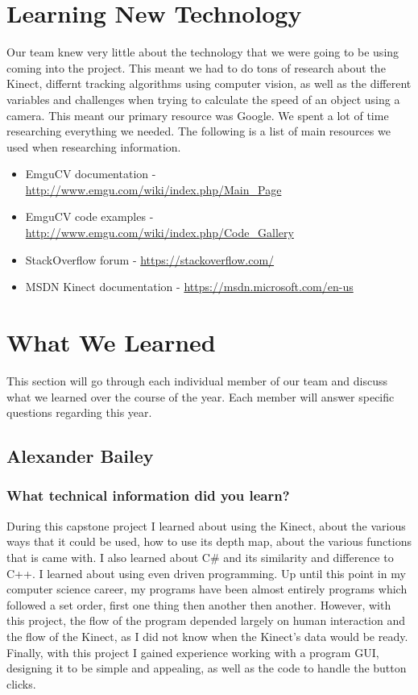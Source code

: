 \documentclass[onecolumn, draftclsnofoot,10pt, compsoc]{IEEEtran}
\begin{document}
\section{Learning New Technology}
Our team knew very little about the technology that we were going to be using coming into the project. This meant we had to do tons of research about the Kinect, differnt tracking algorithms using computer vision, as well as the different variables and challenges when trying to calculate the speed of an object using a camera.
This meant our primary resource was Google.
We spent a lot of time researching everything we needed.
The following is a list of main resources we used when researching information.
\begin{itemize}
\item EmguCV documentation - \url{http://www.emgu.com/wiki/index.php/Main_Page}
\item EmguCV code examples - \url{http://www.emgu.com/wiki/index.php/Code_Gallery}
\item StackOverflow forum - \url{https://stackoverflow.com/}
\item MSDN Kinect documentation - \url{https://msdn.microsoft.com/en-us}
\end{itemize}

\section{What We Learned}
This section will go through each individual member of our team and discuss what we learned over the course of the year. Each member will answer specific questions regarding this year.

\subsection{Alexander Bailey}
\subsubsection{What technical information did you learn?}

During this capstone project I learned  about using the Kinect, about the various ways that it could be used, how to use its depth map, about the various functions that is came with.
I also learned about C\# and its similarity and difference to C++.
I learned about using even driven programming.
Up until this point in my computer science career, my programs have been almost entirely programs which followed a set order, first one thing then another then another.
However, with this project, the flow of the program depended largely on human interaction and the flow of the Kinect, as I did not know when the Kinect's data would be ready.
Finally, with this project I gained experience working with a program GUI, designing it to be simple and appealing, as well as the code to handle the button clicks.
\end{document}
